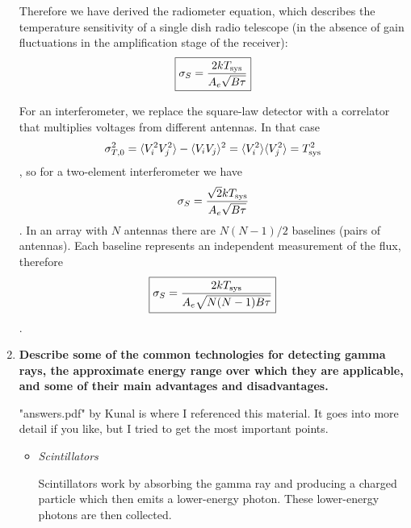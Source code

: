 \begin{enumerate}
      Therefore we have derived the radiometer equation, which describes the temperature
      sensitivity of a single dish radio telescope (in the absence of gain fluctuations in
      the amplification stage of the receiver):
      \begin{dmath}\boxed{
        \sigma_S = \frac{2kT_{\rm sys}}{A_e\sqrt{B\tau}}
      }\end{dmath}

      For an interferometer, we replace the square-law detector with a correlator that multiplies
      voltages from different antennas.  In that case
      \begin{dmath*}
        \sigma_{T,0}^2 = \langle V_i^2V_j^2\rangle - \langle V_iV_j\rangle^2
                       = \langle V_i^2\rangle\langle V_j^2\rangle \nolinebreak
                       = T_{\rm sys}^2
      \end{dmath*},
      so for a two-element interferometer we have
      \begin{dmath}
        \sigma_S = \frac{\sqrt{2}kT_{\rm sys}}{A_e\sqrt{B\tau}}
      \end{dmath}.
      In an array with $N$ antennas there are $N(N-1)/2$ baselines (pairs of antennas).
      Each baseline represents an independent measurement of the flux, therefore
      \begin{dmath}\boxed{
        \sigma_S = \frac{2kT_{\rm sys}}{A_e\sqrt{N(N-1)B\tau}}
      }\end{dmath}.

\item \textbf{Describe some of the common technologies for detecting gamma rays, the approximate
      energy range over which they are applicable, and some of their main advantages
      and disadvantages.}
      
       "answers.pdf" by Kunal is where I referenced this material. It goes into more detail if you like, but I tried to get the most important points.
      
      \begin{itemize}
      \item \emph{Scintillators}
      
      Scintillators work by absorbing the gamma ray and producing a charged particle which then emits a lower-energy photon. These lower-energy photons are then collected. 
      

\end{itemize}
\end{enumerate}

